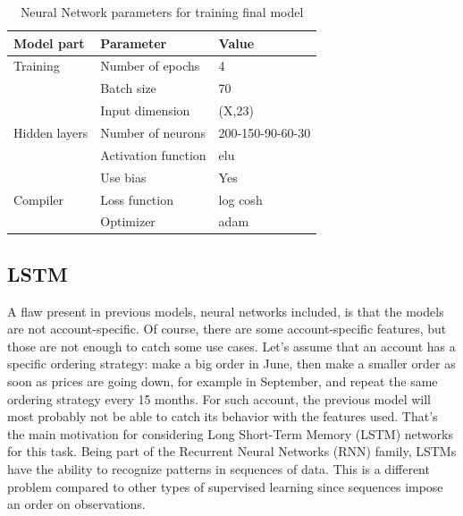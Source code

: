 \begin{table}[b]
    \centering
    \begin{tabular}{l|l|l}
        \textbf{Model part}           & \textbf{Parameter}                 & \textbf{Value}         \\ \hline
        Training                      & Number of epochs                   & 4                     \\
                                      & Batch size                         & 70             \\
                                      & Input dimension                    & (X,23)                     \\ \hline
        Hidden layers                 & Number of neurons                  & 200-150-90-60-30                     \\
                                      & Activation function                & elu                     \\
                                      & Use bias                           & Yes                     \\ \hline
        Compiler                      & Loss function                      & log cosh \\
                                      & Optimizer                          & adam
    \end{tabular}
    \caption{Neural Network parameters for training final model}
    \label{tab:nn-final-parameters}
\end{table}


\subsection{LSTM}
A flaw present in previous models, neural networks included, is that the models are not account-specific. Of course, there are some account-specific features, but those are not enough to catch some use cases. Let's assume that an account has a specific ordering strategy: make a big order in June, then make a smaller order as soon as prices are going down, for example in September, and repeat the same ordering strategy every 15 months. For such account, the previous model will most probably not be able to catch its behavior with the features used. That's the main motivation for considering Long Short-Term Memory (LSTM) networks for this task. Being part of the Recurrent Neural Networks (RNN) family, LSTMs have the ability to recognize patterns in sequences of data. This is a different problem compared to other types of supervised learning since sequences impose an order on observations.


